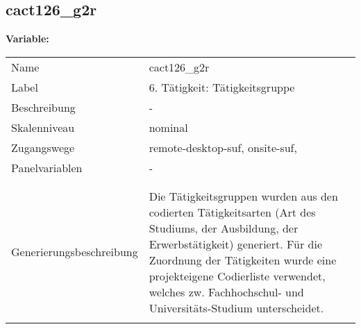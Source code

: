	
	
	\subsection{cact126\_g2r}
	\label{subSection:cact126_g2r}

	\noindent\textbf{Variable:}\\
		\begin{tabular}{lL{11.3cm}}
			\label{tableVariable:cact126_g2r}
			Name & cact126\_g2r \\
			Label & 6. Tätigkeit: Tätigkeitsgruppe  \\
			Beschreibung & - \\
			Skalenniveau & nominal \\
			Zugangswege &
				remote-desktop-suf,
				onsite-suf,
 \\
			Panelvariablen & -
			 \\
			 \\
 \\
					Generierungsbeschreibung & Die Tätigkeitsgruppen wurden aus den codierten Tätigkeitsarten (Art des Studiums, der Ausbildung, der Erwerbstätigkeit) generiert. Für die Zuordnung der Tätigkeiten wurde eine projekteigene Codierliste verwendet, welches zw. Fachhochschul- und Universitäts-Studium unterscheidet.
				 \\	
			 \\
		\end{tabular}






